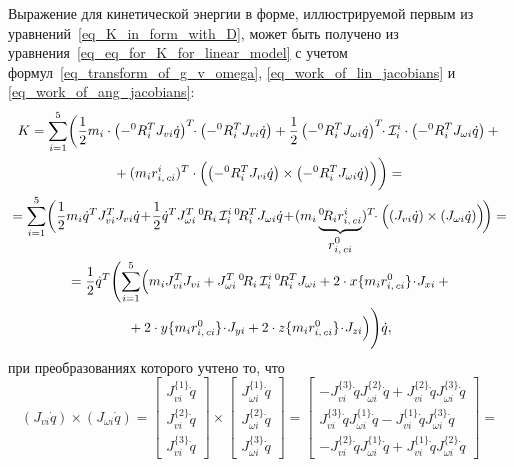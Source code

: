 Выражение для кинетической энергии в форме, иллюстрируемой первым из уравнений~\eqref{eq_K_in_form_with_D}, может быть получено из уравнения~\eqref{eq_eq_for_K_for_linear_model} с учетом формул~\eqref{eq_transform_of_g_v_omega}, \eqref{eq_work_of_lin_jacobians} и \eqref{eq_work_of_ang_jacobians}:
\begin{gather}
    K = \sum_{i=1}^5 \biggl( \frac{1}{2} m_i \cdot \left( -{}^0R_i^T J_{vi} \dot{q} \right)^T \!\!\cdot \left(-{}^0R_i^T J_{vi} \dot{q}\right) + \frac{1}{2} \left( -{}^0R_i^T J_{\omega i} \dot{q} \right)^T \!\!\cdot \mathcal{I}^{i}_i \cdot \left( -{}^0R_i^T J_{\omega i} \dot{q} \right) + {}\notag\\
    {} + (m_ir^i_{i,\,ci})^T \cdot \Bigl( \left( -{}^0R_i^T J_{vi} \dot{q} \right) \times \left( -{}^0R_i^T J_{\omega i} \dot{q} \right) \Bigr) \biggr) = {}\notag\\
    {} = \sum_{i=1}^5 \biggl(\frac{1}{2} m_i \dot{q}^T J_{vi}^T J_{vi} \dot{q} \!+\! \frac{1}{2} \dot{q}^T J_{\omega i}^T \, {}^0\!R_i \, \mathcal{I}^{i}_i \, {}^0\!R_i^T J_{\omega i} \dot{q} \!+\! (m_i \underbrace{{}^0\!R_i r^i_{i,\,ci}}_{\displaystyle r^0_{i,\,ci}})^T \!\!\cdot \Bigl( \left( J_{vi} \dot{q} \right) \times \left( J_{\omega i} \dot{q} \right) \Bigr) \!\biggr) = {}\notag \\
    {} = \frac{1}{2} \dot{q}^T \Biggl(\sum_{i=1}^5 \Bigl(m_i J_{vi}^T J_{vi} + J_{\omega i}^T \, {}^0\!R_i \, \mathcal{I}^{i}_i \, {}^0\!R_i^T J_{\omega i} + 2 \cdot x\{ m_i r^0_{i,\,ci} \} \!\cdot\! J_{xi}  + {}\notag \\
    {} + 2 \cdot y\{ m_i r^0_{i,\,ci} \} \!\cdot\! J_{yi} + 2 \cdot z\{ m_i r^0_{i,\,ci} \} \!\cdot\! J_{zi}\Bigr) \Biggr) \dot{q}, \label{eq_getting_form_with_D_for_K}
\end{gather}
при преобразованиях которого учтено то, что
\begin{equation*}
    \left( J_{vi} \dot{q} \right) \times \left( J_{\omega i} \dot{q} \right) =
    \begin{bmatrix}
        J_{vi}^{\{1\}} \dot{q}\\
        J_{vi}^{\{2\}} \dot{q}\\
        J_{vi}^{\{3\}} \dot{q}
    \end{bmatrix}
    \times
    \begin{bmatrix}
        J_{\omega i}^{\{1\}} \dot{q}\\
        J_{\omega i}^{\{2\}} \dot{q}\\
        J_{\omega i}^{\{3\}} \dot{q}
    \end{bmatrix}
    =
    \begin{bmatrix}
        -J_{vi}^{\{3\}} \dot{q} J_{\omega i}^{\{2\}} \dot{q} + J_{vi}^{\{2\}} \dot{q} J_{\omega i}^{\{3\}} \dot{q}\\
         J_{vi}^{\{3\}} \dot{q} J_{\omega i}^{\{1\}} \dot{q} - J_{vi}^{\{1\}} \dot{q} J_{\omega i}^{\{3\}} \dot{q}\\
        -J_{vi}^{\{2\}} \dot{q} J_{\omega i}^{\{1\}} \dot{q} + J_{vi}^{\{1\}} \dot{q} J_{\omega i}^{\{2\}} \dot{q}
    \end{bmatrix}
    =
\end{equation*}

